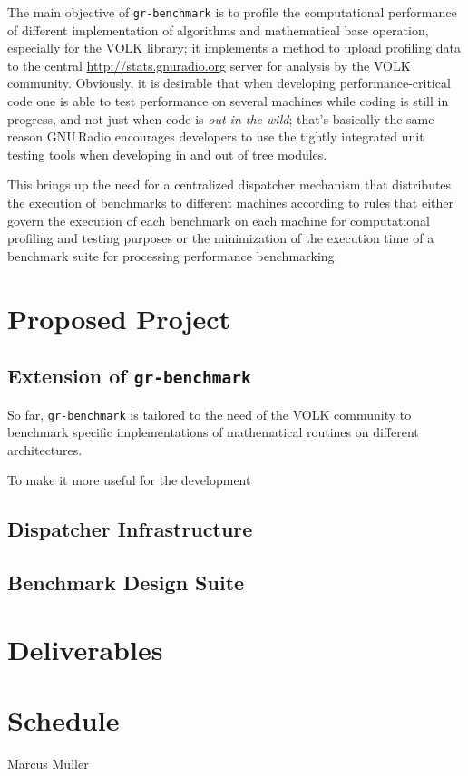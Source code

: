 \documentclass[a4paper]{IEEEtran}
\newcommand{\gr}{GNU\,Radio\xspace}
\newcommand{\grbench}{\texttt{gr-benchmark}\xspace}
\begin{document}
The main objective of \grbench is to profile the computational performance of different implementation
of algorithms and mathematical base operation, especially for the VOLK library\cite{volk};
it implements a method to upload profiling data to the central \url{http://stats.gnuradio.org} server for 
analysis by the VOLK community.
Obviously, it is desirable that when developing performance-critical code one is able to test performance
on several machines while coding is still in progress, and not just when code is \textit{out in the wild}; 
that's basically the same reason \gr encourages developers to use the tightly integrated unit testing tools
when developing in and out of tree modules.

This brings up the need for a centralized dispatcher mechanism that distributes the execution of benchmarks to 
different machines according to rules that either govern the execution of each benchmark on each machine for 
computational profiling and testing purposes or the minimization of the execution time of a benchmark suite for processing 
performance benchmarking.

\section{Proposed Project}

\subsection{Extension of \grbench}

So far, \grbench is tailored to the need of the VOLK community to benchmark specific implementations of
mathematical routines on different architectures.

To make it more useful for the development

\subsection{Dispatcher Infrastructure}



\subsection{Benchmark Design Suite}

\section{Deliverables}

\section{Schedule}

\begin{IEEEbiography}{Marcus Müller}
\end{IEEEbiography}



\end{document}
